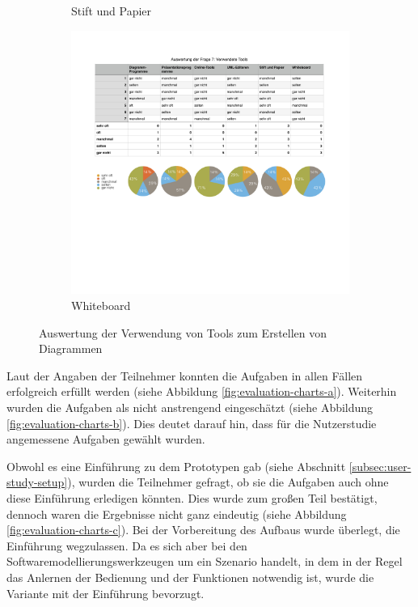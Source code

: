 \begin{figure}[hbt]
\begin{minipage}{.65\textwidth}
\begin{subfigure}[t]{\subfigurewidth}
        \caption{Stift und Papier}
        \label{fig:used-tools-charts-e}
    \end{subfigure}
    \begin{subfigure}[t]{\subfigurewidth}
        \centering
        \includegraphics[scale=\graphicsscale]{resources/used-tools-charts-f}
        \caption{Whiteboard}
        \label{fig:used-tools-charts-f}
    \end{subfigure}
\end{minipage}
\caption{Auswertung der Verwendung von Tools zum Erstellen von Diagrammen}
\label{fig:used-tools-charts}
\end{figure}

Laut der Angaben der Teilnehmer konnten die Aufgaben in allen Fällen erfolgreich erfüllt werden (siehe Abbildung \ref{fig:evaluation-charts-a}). Weiterhin wurden die Aufgaben als nicht anstrengend eingeschätzt (siehe Abbildung \ref{fig:evaluation-charts-b}). Dies deutet darauf hin, dass für die Nutzerstudie angemessene Aufgaben gewählt wurden.

Obwohl es eine Einführung zu dem Prototypen gab (siehe Abschnitt \ref{subsec:user-study-setup}), wurden die Teilnehmer gefragt, ob sie die Aufgaben auch ohne diese Einführung erledigen könnten. Dies wurde zum großen Teil bestätigt, dennoch waren die Ergebnisse nicht ganz eindeutig (siehe Abbildung \ref{fig:evaluation-charts-c}). Bei der Vorbereitung des Aufbaus wurde überlegt, die Einführung wegzulassen. Da es sich aber bei den Softwaremodellierungswerkzeugen um ein Szenario handelt, in dem in der Regel das Anlernen der Bedienung und der Funktionen notwendig ist, wurde die Variante mit der Einführung bevorzugt.

